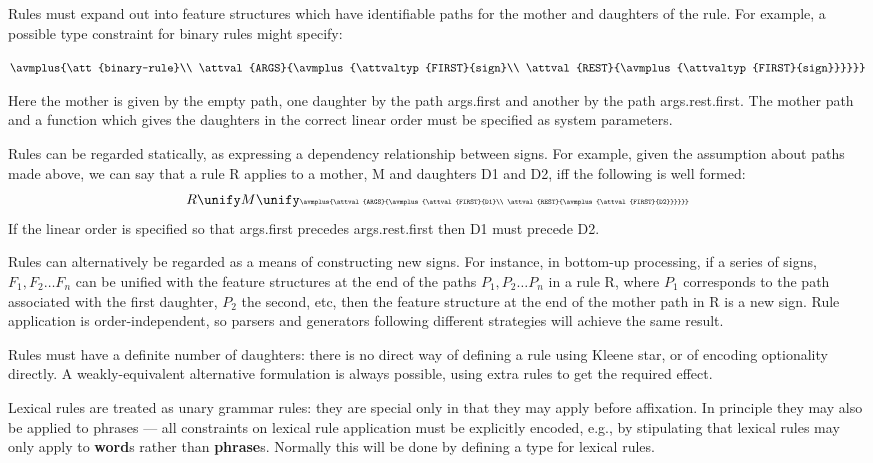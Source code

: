 \documentclass[12pt]{report}
\begin{document}
Rules must expand out into feature structures which have identifiable paths
for the mother and daughters of the rule.  For example,
a possible type constraint for binary rules might specify:
\begin{center}
{\tiny
   $\avmplus{\att{binary-rule}\\
             \attval{ARGS}{\avmplus{\attvaltyp{FIRST}{sign}\\
                                    \attval{REST}{\avmplus{\attvaltyp{FIRST}{sign}}}}}}$}
\end{center}
Here the mother is given by the empty path, one daughter 
by the path {\sc args}.{\sc first} and another by the path
{\sc args}.{\sc rest}.{\sc first}.  
The mother path and a function which gives the
daughters in the correct linear order must be specified as system parameters.

Rules can be regarded statically,
as expressing a dependency relationship between signs.
For example, given the assumption about paths made above, 
we can say that a rule R applies to a mother, M and daughters D1 and D2,
iff the following is well
formed:
\[
R \unify M \unify
\mbox{\tiny
   $\avmplus{\attval{ARGS}{\avmplus{\attval{FIRST}{D1}\\
                                    \attval{REST}{\avmplus{\attval{FIRST}{D2}}}}}}$}
\] 
If the linear order is specified so that {\sc args.first} precedes
{\sc args.rest.first} then D1 must precede D2.


Rules can alternatively be regarded as a means of constructing
new signs.  For
instance, in bottom-up processing,
if a series of signs, $F_{1}, F_{2} \ldots F_n$ can be unified 
with the feature structures at the end of the paths $P_{1}, P_{2} \ldots P_{n}$
in a rule R, where $P_{1}$ corresponds to the path associated with the
first daughter, $P_{2}$ the second, etc,
then the feature structure at the end of
the mother path in R is a new sign.  
Rule application is order-independent, so parsers and generators 
following different 
strategies will achieve the same result.  

Rules must have a definite number of daughters: there is no direct way of
defining a rule using Kleene star,
or of encoding optionality directly.  A weakly-equivalent
alternative formulation is always possible,
using extra rules to get the required effect.

Lexical rules are treated as unary grammar rules: 
they are special only in that
they may apply before affixation.  In principle
they may also be applied to phrases ---
all constraints on lexical rule application must be explicitly encoded,
e.g., by stipulating that lexical rules may only apply
to {\bf word}s rather than {\bf phrase}s.
Normally this will be done by defining a type for lexical rules.
\end{document}
